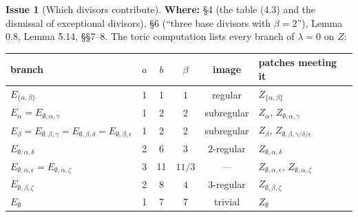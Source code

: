 \documentclass[12pt,letterpaper]{article}
\newcommand{\loc}[1]{\textbf{Where:} #1.}
\theoremstyle{definition}
\newtheorem{issue}{Issue}[section]
\begin{document}
\begin{issue}[Which divisors contribute]\label{iss:divisors}
\loc{\S4 (the table (4.3) and the dismissal of exceptional divisors), \S6
(``three base divisors with $\beta=2$''), Lemma 0.8, Lemma 5.14, \S\S7--8}
The toric computation lists every branch of $\lambda=0$ on $Z$:

\smallskip
\begin{center}
\begin{tabular}{lccccl}
\toprule
branch & $a$ & $b$ & $\beta$ & image & patches meeting it\\
\midrule
$E_{\{\alpha,\beta\}}$ & 1 & 1 & 1 & regular & $Z_{\{\alpha,\beta\}}$\\
$E_{\alpha}=E_{\emptyset,\alpha,\gamma}$ & 1 & 2 & 2 & subregular & $Z_\alpha$, $Z_{\emptyset,\alpha,\gamma}$\\
$E_{\beta}=E_{\emptyset,\beta,\gamma}=E_{\emptyset,\beta,\delta}=E_{\emptyset,\beta,\epsilon}$ & 1 & 2 & 2 & subregular & $Z_\beta$, $Z_{\emptyset,\beta,\gamma/\delta/\epsilon}$\\
$E_{\emptyset,\alpha,\delta}$ & 2 & 6 & 3 & $2$-regular & $Z_{\emptyset,\alpha,\delta}$\\
$E_{\emptyset,\alpha,\epsilon}=E_{\emptyset,\alpha,\zeta}$ & 3 & 11 & $11/3$ & --- & $Z_{\emptyset,\alpha,\epsilon}$, $Z_{\emptyset,\alpha,\zeta}$\\
$E_{\emptyset,\beta,\zeta}$ & 2 & 8 & 4 & $3$-regular & $Z_{\emptyset,\beta,\zeta}$\\
$E_{\emptyset}$ & 1 & 7 & 7 & trivial & $Z_\emptyset$\\
\bottomrule
\end{tabular}
\end{center}
\smallskip


\end{issue}
\end{document}
